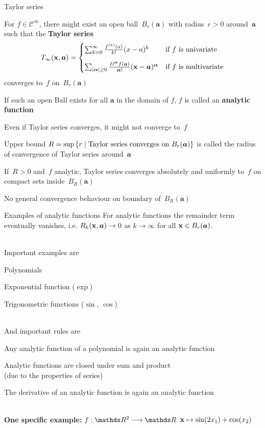 \documentclass[11pt,compress,t,notes=noshow, xcolor=table]{beamer}
\begin{document}
\begin{framei}{Taylor series}

    \item For $f \in \mathcal{C}^\infty$, there might exist an open ball~$B_r(\bm{a})$ with radius~$r>0$ around~$\bm{a}$ such that the \textbf{Taylor series}
        $$        
        T_\infty(\mathbf{x},\bm{a})=\begin{cases}
            \sum_{k=0}^{\infty} \frac{f^{(k)}(a)}{k!}(x-a)^k&\text{if $f$ is univariate}\\[10pt]
            \sum_{|\bm{\alpha}| \geq 0} \frac{D^{\bm{\alpha}} f(\bm{a})}{{\bm{\alpha}}!} (\mathbf{x} - \bm{a})^{\bm{\alpha}}&\text{if $f$ is multivariate}
        \end{cases}
        $$
    converges to~$f$ on~$B_r(\bm{a})$
    \item If such an open Ball exists for all $\bm{a}$ in the domain of $f$, $f$ is called an \textbf{analytic function}
    \item Even if Taylor series converges, it might not converge to~$f$
    \item Upper bound $R = \sup \left\lbrace r \;|\; \textnormal{Taylor series converges on } B_r(\bm{a}) \right\rbrace$ is called the radius of convergence of Taylor series around~$\bm{a}$
    \item If~$R>0$ and~$f$ analytic, Taylor series converges absolutely and uniformly to~$f$ on compact sets inside~$B_R(\bm{a})$
    \item No general convergence behaviour on boundary of~$B_R(\bm{a})$

\end{framei}


\begin{frame2}{Examples of analytic functions}
    For analytic functions the remainder term eventually vanishes, i.e.
    $R_k(\mathbf{x}, \bm{a}) \rightarrow 0$ as $k \rightarrow \infty$ for all $\mathbf{x} \in B_r(\bm{a})$.\\\,

    Important examples are\begin{itemizeM}
        \item Polynomials
        \item Exponential function ($\exp$)
        \item Trigonometric functions ($\sin$, $\cos$)
    \end{itemizeM}\,\\
    And important rules are \begin{itemizeM}
       \item Any analytic function of a polynomial is again an analytic function
       \item Analytic functions are closed under sum and product \\(due to the properties of series)
       \item The derivative of an analytic function is again an analytic function
    \end{itemizeM}\,\\
    \textbf{One specific example: } $f:\R^2\longrightarrow \R$ $\mathbf{x} \mapsto \sin(2x_1) + \cos(x_2)$
\end{frame2}
\end{document}
